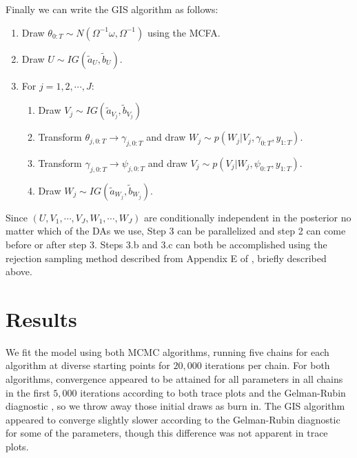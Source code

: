 \documentclass[graybox]{svmult}
\begin{document}
Finally we can write the GIS algorithm as follows:
\begin{enumerate}
\item Draw $\theta_{0:T}\sim N(\Omega^{-1}\omega, \Omega^{-1})$ using the MCFA.
\item Draw $U\sim IG(\tilde{a}_U,\tilde{b}_U)$. 
\item For $j=1,2,\cdots,J$:
\begin{enumerate}
\item Draw $V_j \sim IG(\tilde{a}_{V_j}, \tilde{b}_{V_j})$
\item Transform $\theta_{j,0:T}\to \gamma_{j,0:T}$ and draw $W_j\sim p(W_j|V_j,\gamma_{0:T},y_{1:T})$.
\item Transform $\gamma_{j,0:T}\to \psi_{j,0:T}$ and draw $V_j\sim p(V_j|W_j,\psi_{0:T},y_{1:T})$.
\item Draw $W_j \sim IG(\tilde{a}_{W_j}, \tilde{b}_{W_j})$.
\end{enumerate}
\end{enumerate}
Since $(U,V_1,\cdots,V_J,W_1,\cdots,W_J)$ are conditionally independent in the posterior no matter which of the DAs we use, Step 3 can be parallelized and step 2 can come before or after step 3. Steps 3.b and 3.c can both be accomplished using the rejection sampling method described from Appendix E of \citet{simpson2014interweaving}, briefly described above.

\section{Results}\label{sec:results}

We fit the model using both MCMC algorithms, running five chains for each algorithm at diverse starting points for $20,000$ iterations per chain. For both algorithms, convergence appeared to be attained for all parameters in all chains in the first $5,000$ iterations according to both trace plots and the Gelman-Rubin diagnostic \citep{brooks1998general}, so we throw away those initial draws as burn in. The GIS algorithm appeared to converge slightly slower according to the Gelman-Rubin diagnostic for some of the parameters, though this difference was not apparent in trace plots. 
\end{document}
